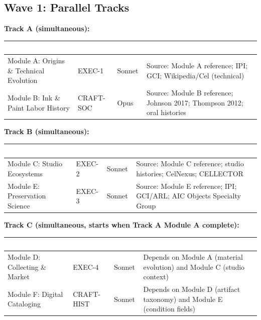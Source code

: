 \documentclass[11pt,letterpaper]{article}
\newcommand{\tableheader}[1]{\textbf{\sffamily\textcolor{white}{#1}}}
\begin{document}
\subsection{Wave 1: Parallel Tracks}

\textbf{Track A (simultaneous):}

\begin{center}
\begin{tabularx}{\textwidth}{L{2.5cm}L{2cm}L{2cm}X}
\toprule
{}
\tableheader{Task} & \tableheader{Agent} & \tableheader{Model} & \tableheader{Notes} \\
\midrule
Module A: Origins \& Technical Evolution & EXEC-1 & Sonnet & Source: Module A reference; IPI; GCI; Wikipedia/Cel (technical) \\
Module B: Ink \& Paint Labor History & CRAFT-SOC & Opus & Source: Module B reference; Johnson 2017; Thompson 2012; oral histories \\
\bottomrule
\end{tabularx}
\end{center}

\textbf{Track B (simultaneous):}

\begin{center}
\begin{tabularx}{\textwidth}{L{2.5cm}L{2cm}L{2cm}X}
\toprule
{}
\tableheader{Task} & \tableheader{Agent} & \tableheader{Model} & \tableheader{Notes} \\
\midrule
Module C: Studio Ecosystems & EXEC-2 & Sonnet & Source: Module C reference; studio histories; CelNexus; CELLECTOR \\
Module E: Preservation Science & EXEC-3 & Sonnet & Source: Module E reference; IPI; GCI/ARL; AIC Objects Specialty Group \\
\bottomrule
\end{tabularx}
\end{center}

\textbf{Track C (simultaneous, starts when Track A Module A complete):}

\begin{center}
\begin{tabularx}{\textwidth}{L{2.5cm}L{2cm}L{2cm}X}
\toprule
{}
\tableheader{Task} & \tableheader{Agent} & \tableheader{Model} & \tableheader{Notes} \\
\midrule
Module D: Collecting \& Market & EXEC-4 & Sonnet & Depends on Module A (material evolution) and Module C (studio context) \\
Module F: Digital Cataloging & CRAFT-HIST & Sonnet & Depends on Module D (artifact taxonomy) and Module E (condition fields) \\
\bottomrule
\end{tabularx}
\end{center}
\end{document}
